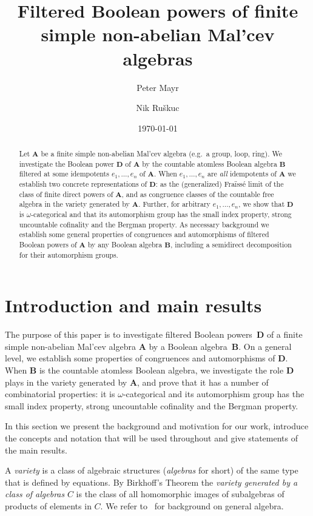 \documentclass[12pt,a4paper,reqno]{amsart}
\title[Filtered Boolean powers of simple algebras]{Filtered Boolean powers of finite simple non-abelian Mal'cev algebras}
\author{Peter Mayr}
\author{Nik Ru{\v s}kuc}
\date{\today}
\numberwithin{equation}{section}
\theoremstyle{plain}
\theoremstyle{definition}
\newcommand{\A}{\mathbf{A}}
\newcommand{\B}{\mathbf{B}}
\newcommand{\D}{\mathbf{D}}
\begin{document}
\maketitle

\begin{abstract}
 Let $\A$ be a finite simple non-abelian Mal'cev algebra (e.g.\ a group, loop, ring).
 We investigate the Boolean power $\D$ of $\A$ by the countable atomless Boolean algebra $\B$ filtered at 
 some idempotents $e_1,\dots,e_n$ of $\A$.
When $e_1,\dots,e_n$ are \emph{all} idempotents of $\A$ we establish two concrete representations of $\D$: as 
the (generalized) Fra{\"i}ss{\'e} limit of the class of finite direct powers of $\A$, and as
congruence classes of the
 countable free algebra in the variety generated by $\A$.
 Further, for arbitrary $e_1,\dots,e_n$, we show that $\D$ is $\omega$-categorical and that its automorphism group
 has the small index property, strong uncountable cofinality and the Bergman property.
 As necessary background we establish some general properties of congruences and automorphisms of filtered Boolean powers of $\A$ by any Boolean algebra $\B$, including a semidirect decomposition for their automorphism groups.
\end{abstract}  


\section{Introduction and main results}


The purpose of this paper is to investigate filtered Boolean powers~$\D$ of a finite simple non-abelian Mal'cev algebra $\A$ by a Boolean algebra~$\B$.
On a general level, we establish some properties of congruences and automorphisms of $\D$.
When $\B$ is the countable atomless Boolean algebra, we investigate the role $\D$ plays in the variety generated by $\A$, and prove that it has a number of combinatorial properties: 
it is $\omega$-categorical and its automorphism group has the small index property, strong uncountable cofinality and the Bergman property.

In this section we present the background and motivation for our work, introduce the concepts and notation that will be used throughout and give statements of the main results.


 A \emph{variety} is a class of algebraic structures (\emph{algebras} for short) of the same type that is defined by
 equations. By Birkhoff's Theorem the \emph{variety generated by a class of algebras} $C$ is the class of all
 homomorphic images of subalgebras of products of elements in $C$. We refer to~\cite{BS:CUA} for background on
 general algebra.
  
\end{document}

